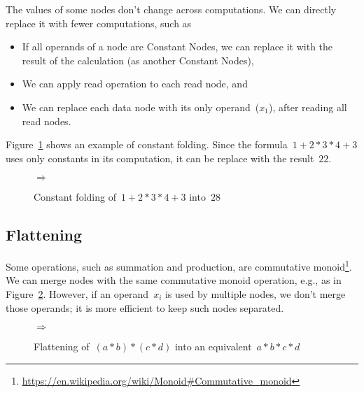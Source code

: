 \documentclass{article}
\begin{document}
The values of some nodes don't change across computations. We can directly replace it with fewer computations, such as
%
\begin{itemize}
	\item If all operands of a node are Constant Nodes, we can replace it with the result of the calculation (as another Constant Nodes),
	\item We can apply read operation to each read node, and
	\item We can replace each data node with its only operand~($x_1$), after reading all read nodes.
\end{itemize}
%
Figure~\ref{fig:optimization:folding-example} shows an example of constant folding.
Since the formula~$1 + 2 * 3 * 4 + 3$ uses only constants in its computation, it can be replace with the result~$22$.
%
\begin{figure}
	\centering
	\quad$\Rightarrow$\quad
	\caption{Constant folding of~$1 + 2 * 3 * 4 + 3$  into~$28$}
	\label{fig:optimization:folding-example}
\end{figure}

\subsection{Flattening}

Some operations, such as summation and production, are commutative monoid\footnote{
	\url{https://en.wikipedia.org/wiki/Monoid\#Commutative_monoid}
}.
We can merge nodes with the same commutative monoid operation, e.g., as in Figure~\ref{fig:optimization:flatten-example}.
However, if an operand~$x_i$ is used by multiple nodes, we don't merge those operands; it is more efficient to keep such nodes separated.
%
\begin{figure}
	\centering
	\quad$\Rightarrow$\quad
	\caption{Flattening of~$(a * b) * (c * d)$ into an equivalent~$a * b * c * d$}
	\label{fig:optimization:flatten-example}
\end{figure}
\end{document}
